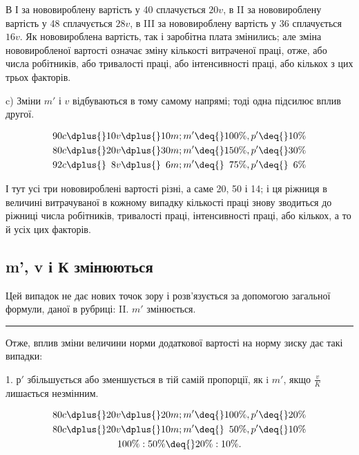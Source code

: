
В І за нововироблену вартість у 40 сплачується $20 v$, в II
за нововироблену вартість у 48 сплачується $28 v$, в III за нововироблену
вартість у 36 сплачується $16 v$. Як нововироблена
вартість, так і заробітна плата змінились; але зміна нововиробленої
вартості означає зміну кількості витраченої праці, отже,
або числа робітників, або тривалості праці, або інтенсивності
праці, або кількох з цих трьох факторів.

c) Зміни $m'$ і $v$ відбуваються в тому самому напрямі; тоді
одна підсилює вплив другої.

\begin{gather*}
90 c \dplus{} 10 v \dplus{} 10 m; m' \deq{} 100\%, p' \deq{} 10\% \\
80 c \dplus{} 20 v \dplus{} 30 m; m' \deq{} 150\%, p' \deq{} 30\% \\
92 c \dplus{} \phantom{0}8 v \dplus{} \phantom{0}6 m; m' \deq{} \phantom{1}75\%, p' \deq{} \phantom{1}6\%
\end{gather*}

\noindent{}І тут усі три нововироблені вартості різні, а саме 20, 50 і 14;
і ця ріжниця в величині витрачуваної в кожному випадку кількості
праці знову зводиться до ріжниці числа робітників, тривалості
праці, інтенсивності праці, або кількох, а то й усіх цих факторів.

\subsection[m', v і К змінюються]{m', v і К змінюються\footnotemarkZ{}}

\noindent{}Цей випадок не дає нових точок зору і розв’язується за допомогою
загальної формули, даної в рубриці: II. $m'$ змінюється.

\pfbreak{}

Отже, вплив зміни величини норми додаткової вартості на
норму зиску дає такі випадки:

1. $р'$ збільшується або зменшується в тій самій пропорції, як
i $m'$, якщо $\frac{v}{K}$  лишається незмінним.

\begin{gather*}
80 c \dplus{} 20 v \dplus{} 20 m; m' \deq{} 100\%, p' \deq{} 20\% \\
80 c \dplus{} 20 v \dplus{} 10 m; m' \deq{} \phantom{1}50\%, p' \deq{} 10\% \\
100\% : 50\% \deq{} 20\% : 10\%.
\end{gather*}

